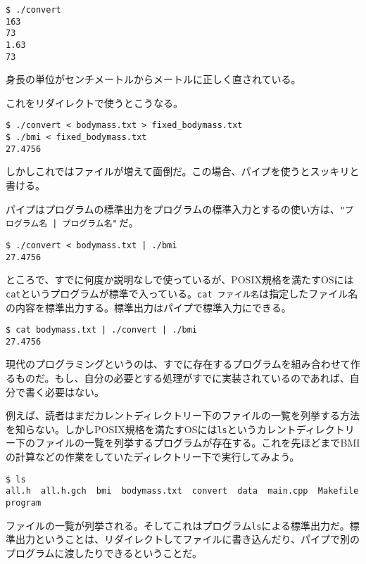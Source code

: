 \begin{lstlisting}[style=terminal]
$ ./convert
163
73
1.63
73
\end{lstlisting}

身長の単位がセンチメートルからメートルに正しく直されている。

これをリダイレクトで使うとこうなる。

\begin{lstlisting}[style=terminal]
$ ./convert < bodymass.txt > fixed_bodymass.txt
$ ./bmi < fixed_bodymass.txt
27.4756
\end{lstlisting}

しかしこれではファイルが増えて面倒だ。この場合、パイプを使うとスッキリと書ける。

パイプはプログラムの標準出力をプログラムの標準入力とするの使い方は、\texttt{"プログラム名 | プログラム名"}\,だ。

\begin{lstlisting}[style=terminal]
$ ./convert < bodymass.txt | ./bmi
27.4756
\end{lstlisting}

ところで、すでに何度か説明なしで使っているが、POSIX規格を満たすOSには\texttt{cat}というプログラムが標準で入っている。\texttt{cat ファイル名}は指定したファイル名の内容を標準出力する。標準出力はパイプで標準入力にできる。

\begin{lstlisting}[style=terminal]
$ cat bodymass.txt | ./convert | ./bmi
27.4756
\end{lstlisting}


現代のプログラミングというのは、すでに存在するプログラムを組み合わせて作るものだ。もし、自分の必要とする処理がすでに実装されているのであれば、自分で書く必要はない。

例えば、読者はまだカレントディレクトリー下のファイルの一覧を列挙する方法を知らない。しかしPOSIX規格を満たすOSには\texttt{ls}というカレントディレクトリー下のファイルの一覧を列挙するプログラムが存在する。これを先ほどまでBMIの計算などの作業をしていたディレクトリー下で実行してみよう。

\begin{lstlisting}[style=terminal]
$ ls
all.h  all.h.gch  bmi  bodymass.txt  convert  data  main.cpp  Makefile  program
\end{lstlisting}

ファイルの一覧が列挙される。そしてこれはプログラム\texttt{ls}による標準出力だ。標準出力ということは、リダイレクトしてファイルに書き込んだり、パイプで別のプログラムに渡したりできるということだ。

